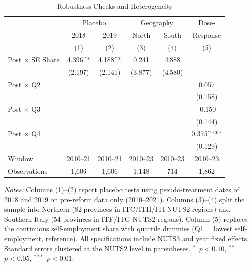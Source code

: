 \begin{table}[t]
\centering
\caption{Robustness Checks and Heterogeneity}
\label{tab:robust}
\small
\begin{tabular}{lccccc}
\toprule
& \multicolumn{2}{c}{Placebo} & \multicolumn{2}{c}{Geography} & Dose- \\
& 2018 & 2019 & North & South & Response \\
& (1) & (2) & (3) & (4) & (5) \\
\midrule
Post $\times$ SE Share & 4.396^{*} & 4.188^{*} & 0.241 & 4.888 & \\
 & (2.197) & (2.141) & (3.877) & (4.580) & \\
Post $\times$ Q2 & & & & & 0.057 \\
 & & & & & (0.158) \\
Post $\times$ Q3 & & & & & -0.150 \\
 & & & & & (0.144) \\
Post $\times$ Q4 & & & & & 0.375^{***} \\
 & & & & & (0.129) \\
\midrule
Window & 2010--21 & 2010--21 & 2010--23 & 2010--23 & 2010--23 \\
Observations & 1,606 & 1,606 & 1,148 & 714 & 1,862 \\
\bottomrule
\end{tabular}
\par\vspace{0.3em}\begin{flushleft}\small
\textit{Notes:} Columns (1)--(2) report placebo tests using pseudo-treatment dates of 2018 and 2019 on pre-reform data only (2010--2021). Columns (3)--(4) split the sample into Northern (82 provinces in ITC/ITH/ITI NUTS2 regions) and Southern Italy (54 provinces in ITF/ITG NUTS2 regions). Column (5) replaces the continuous self-employment share with quartile dummies (Q1 = lowest self-employment, reference). All specifications include NUTS3 and year fixed effects. Standard errors clustered at the NUTS2 level in parentheses. $^{*}$~$p<0.10$, $^{**}$~$p<0.05$, $^{***}$~$p<0.01$.
\end{flushleft}
\end{table}
